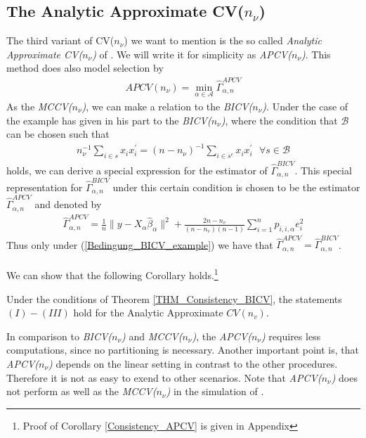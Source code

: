 \documentclass[Research_Module_ES.tex]{subfiles}
\begin{document}
\subsection{The Analytic Approximate CV($n_\nu$)}
The third variant of CV($n_\nu$) we want to mention is the so called \textit{Analytic Approximate CV($n_\nu$)} of \cite{shao}. We will write it for simplicity as \textit{APCV($n_\nu$)}. This method does also model selection by 
\begin{align*}
APCV(n_\nu)=\min_{\alpha\in\mathcal{A}}\hat{\Gamma}_{\alpha,n}^{APCV}
\end{align*}
As the \textit{MCCV($n_\nu$)}, we can make a relation to the \textit{BICV($n_\nu$)}. Under the
case of the example \cite{shao} has given in his part to the \textit{BICV($n_\nu$)}, where the condition that $\mathcal{B}$ can be chosen such that
\begin{align}
\label{Bedingung_BICV_example}
	n_\nu^{-1}\sum_{i\in s}x_i x_i^\prime=(n-n_\nu)^{-1}\sum_{i\in s^c}x_i x_i^\prime~~~\forall s\in\mathcal{B}
\end{align}
holds, we can derive a special expression for the estimator of $\hat{\Gamma}_{\alpha,n}^{BICV}$. This special representation for $\hat{\Gamma}_{\alpha,n}^{BICV}$ under this certain condition is chosen to be the estimator $\hat{\Gamma}_{\alpha,n}^{APCV}$ and denoted by
\begin{align*}
\hat{\Gamma}_{\alpha,n}^{APCV}=\frac{1}{n}\lVert y-X_\alpha\hat{\beta}_\alpha\rVert^2 + \frac{2n-n_v}{(n-n_v)(n-1)}\sum_{i=1}^np_{i,i,\alpha}e_i^2
\end{align*} 
Thus only under (\ref{Bedingung_BICV_example}) we have that 
$\hat{\Gamma}_{\alpha,n}^{APCV}=\hat{\Gamma}_{\alpha,n}^{BICV}$.\\\\
We can show that the following Corollary holds.\footnote{Proof of Corollary \ref{Consistency_APCV} is given in Appendix }
\begin{coro}
\label{Consistency_APCV}
Under the conditions of Theorem \ref{THM_Consistency_BICV}, the statements $(I)-(III)$ hold for the Analytic Approximate $CV(n_v)$.
\end{coro}

In comparison to \textit{BICV($n_\nu$)} and \textit{MCCV($n_\nu$)}, the \textit{APCV($n_\nu$)} requires less computations, since no partitioning is necessary. Another important point is, that \textit{APCV($n_\nu$)} depends on the linear setting in contrast to the other procedures. Therefore it is not as easy to exend to other scenarios. Note that \textit{APCV($n_\nu$)} does not perform as well as the \textit{MCCV($n_\nu$)} in the simulation of \cite{shao}.
\end{document}
